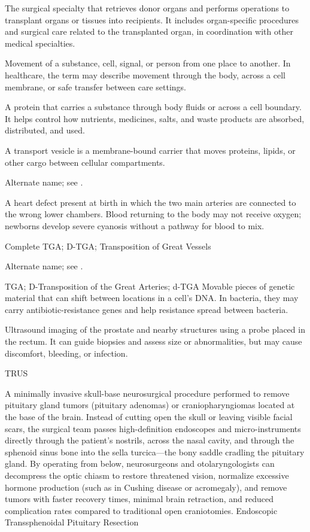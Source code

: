  The surgical specialty that retrieves donor organs and performs operations to transplant organs or tissues into recipients. It includes organ-specific procedures and surgical care related to the transplanted organ, in coordination with other medical specialties.

 Movement of a substance, cell, signal, or person from one place to another. In healthcare, the term may describe movement through the body, across a cell membrane, or safe transfer between care settings.

 A protein that carries a substance through body fluids or across a cell boundary. It helps control how nutrients, medicines, salts, and waste products are absorbed, distributed, and used.

 A transport vesicle is a membrane-bound carrier that moves proteins, lipids, or other cargo between cellular compartments.

 Alternate name; see .

 A heart defect present at birth in which the two main arteries are connected to the wrong lower chambers. Blood returning to the body may not receive oxygen; newborns develop severe cyanosis without a pathway for blood to mix.

\synonyms
Complete TGA; D-TGA; Transposition of Great Vessels

 Alternate name; see .

\synonyms
TGA; D-Transposition of the Great Arteries; d-TGA
 Movable pieces of genetic material that can shift between locations in a cell’s DNA. In bacteria, they may carry antibiotic-resistance genes and help resistance spread between bacteria.

 Ultrasound imaging of the prostate and nearby structures using a probe placed in the rectum. It can guide biopsies and assess size or abnormalities, but may cause discomfort, bleeding, or infection.

\synonyms
TRUS

 A minimally invasive skull-base neurosurgical procedure performed to remove pituitary gland tumors (pituitary adenomas) or craniopharyngiomas located at the base of the brain. Instead of cutting open the skull or leaving visible facial scars, the surgical team passes high-definition endoscopes and micro-instruments directly through the patient's nostrils, across the nasal cavity, and through the sphenoid sinus bone into the sella turcica—the bony saddle cradling the pituitary gland. By operating from below, neurosurgeons and otolaryngologists can decompress the optic chiasm to restore threatened vision, normalize excessive hormone production (such as in Cushing disease or acromegaly), and remove tumors with faster recovery times, minimal brain retraction, and reduced complication rates compared to traditional open craniotomies.
\synonyms
Endoscopic Transsphenoidal Pituitary Resection

